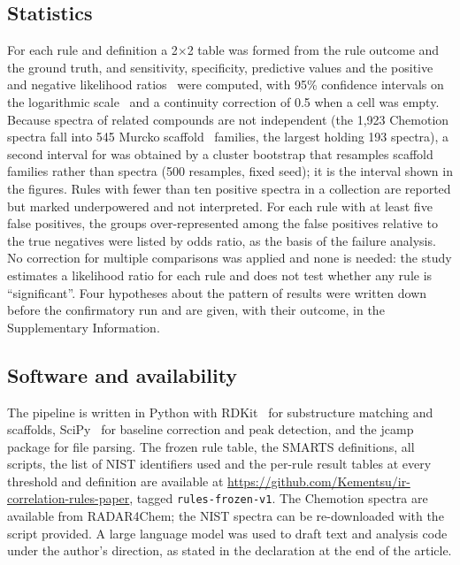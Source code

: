 \subsection{Statistics}
\label{sec:metrics}

For each rule and definition a 2$\times$2 table was formed from the rule outcome and the ground truth, and sensitivity, specificity, predictive values and the positive and negative likelihood ratios~\cite{deeks2004likelihood} were computed, with 95\% confidence intervals on the logarithmic scale~\cite{simel1991likelihood} and a continuity correction of 0.5 when a cell was empty. Because spectra of related compounds are not independent (the 1,923 Chemotion spectra fall into 545 Murcko scaffold~\cite{bemis1996murcko} families, the largest holding 193 spectra), a second interval for \LRp{} was obtained by a cluster bootstrap that resamples scaffold families rather than spectra (500 resamples, fixed seed); it is the interval shown in the figures. Rules with fewer than ten positive spectra in a collection are reported but marked underpowered and not interpreted. For each rule with at least five false positives, the groups over-represented among the false positives relative to the true negatives were listed by odds ratio, as the basis of the failure analysis. No correction for multiple comparisons was applied and none is needed: the study estimates a likelihood ratio for each rule and does not test whether any rule is ``significant''. Four hypotheses about the pattern of results were written down before the confirmatory run and are given, with their outcome, in the Supplementary Information.

\subsection{Software and availability}
\label{sec:software}

The pipeline is written in Python with RDKit~\cite{rdkit} for substructure matching and scaffolds, SciPy~\cite{virtanen2020scipy} for baseline correction and peak detection, and the jcamp package for file parsing. The frozen rule table, the SMARTS definitions, all scripts, the list of NIST identifiers used and the per-rule result tables at every threshold and definition are available at \url{https://github.com/Kementsu/ir-correlation-rules-paper}, tagged \texttt{rules-frozen-v1}. The Chemotion spectra are available from RADAR4Chem; the NIST spectra can be re-downloaded with the script provided. A large language model was used to draft text and analysis code under the author's direction, as stated in the declaration at the end of the article.
